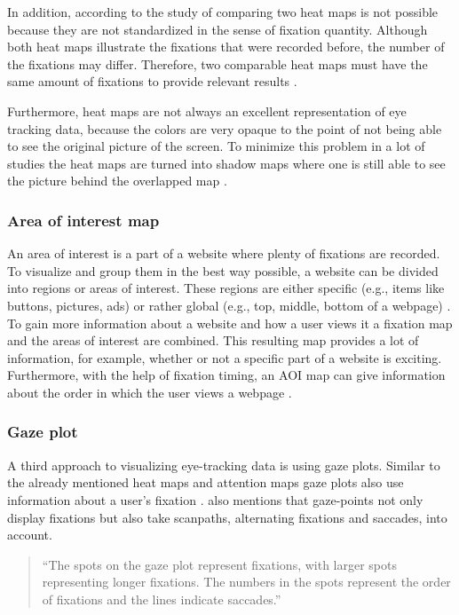 In addition, according to the study of \textcite[]{djamasbi2010efficiency} comparing two heat maps is not possible because they are not standardized in the sense of fixation quantity. Although both heat maps illustrate the fixations that were recorded before, the number of the fixations may differ. Therefore, two comparable heat maps must have the same amount of fixations to provide relevant results \autocite[]{djamasbi2010efficiency}. 

Furthermore, heat maps are not always an excellent representation of eye tracking data, because the colors are very opaque to the point of not being able to see the original picture of the screen. To minimize this problem in a lot of studies the heat maps are turned into shadow maps where one is still able to see the picture behind the overlapped map \autocite[]{vspakov2007visualization}.

\subsubsection{Area of interest map}
An area of interest is a part of a website where plenty of fixations are recorded. To visualize and group them in the best way possible, a website can be divided into regions or areas of interest. These regions are either specific (e.g., items like buttons, pictures, ads) or rather global (e.g., top, middle, bottom of a webpage) \autocite[]{gonzalez2011different, djamasbi2014eye}. To gain more information about a website and how a user views it a fixation map and the areas of interest are combined. This resulting map provides a lot of information, for example, whether or not a specific part of a website is exciting. Furthermore, with the help of fixation timing, an AOI map can give information about the order in which the user views a webpage \autocite[]{djamasbi2014eye}.

\subsubsection{Gaze plot}
A third approach to visualizing eye-tracking data is using gaze plots. Similar to the already mentioned heat maps and attention maps gaze plots also use information about a user's fixation \autocite[]{kurzhals2016gaze}. \textcite[]{kurzhals2016gaze} also mentions that gaze-points not only display fixations but also take scanpaths, alternating fixations and saccades, into account. 

\begin{quote}
``The spots on the gaze plot represent fixations, with larger spots representing longer fixations. The numbers in the spots represent the order of fixations and the lines indicate saccades.''
\autocite[]{djamasbi2014eye}
\end{quote}

